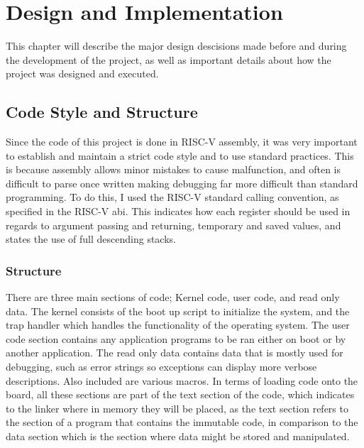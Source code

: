 \chapter{Design and Implementation}
\label{cha:design}
This chapter will describe the major design descisions made before and during the development of the project, as well as important details about how the project was designed and executed.
\section{Code Style and Structure}
Since the code of this project is done in RISC-V assembly, it was very important to establish and maintain a strict code style and to use standard practices. This is because assembly allows minor mistakes to cause malfunction, and often is difficult to parse once written making debugging far more difficult than standard programming. To do this, I used the RISC-V standard calling convention, as specified in the RISC-V \ac{abi}. This indicates how each register should be used in regards to argument passing and returning, temporary and saved values, and states the use of full descending stacks\cite{riscv_abi}.
\subsection{Structure}
There are three main sections of code; Kernel code, user code, and read only data. The kernel consists of the boot up script to initialize the system, and the trap handler which handles the functionality of the operating system. The user code section contains any application programs to be ran either on boot or by another application. The read only data contains data that is mostly used for debugging, such as error strings so exceptions can display more verbose descriptions. Also included are various macros. In terms of loading code onto the board, all these sections are part of the text section of the code, which indicates to the linker where in memory they will be placed, as the text section refers to the section of a program that contains the immutable code, in comparison to the data section which is the section where data might be stored and manipulated.
